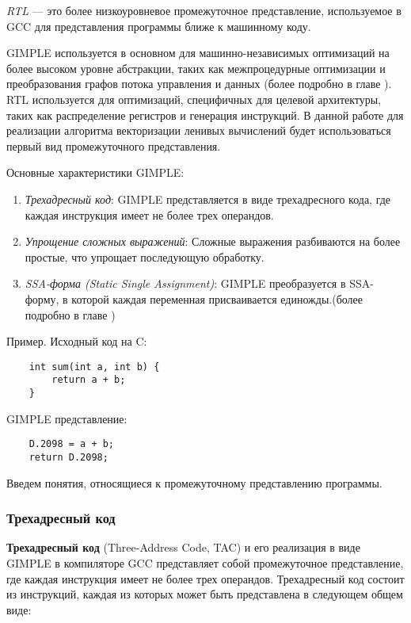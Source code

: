 \textit{RTL} — это более низкоуровневое промежуточное представление, используемое в GCC для представления программы ближе к машинному коду.

GIMPLE используется в основном для машинно-независимых оптимизаций на более высоком уровне абстракции, таких как межпроцедурные оптимизации и преобразования графов потока управления и данных (более подробно в главе \todo[номер]). RTL используется для оптимизаций, специфичных для целевой архитектуры, таких как распределение регистров и генерация инструкций. В данной работе для реализации алгоритма векторизации ленивых вычислений будет использоваться первый вид промежуточного представления.

Основные характеристики GIMPLE:
\begin{enumerate}
    \item \textit{Трехадресный код}: GIMPLE представляется в виде трехадресного кода, где каждая инструкция имеет не более трех операндов.
    \item \textit{Упрощение сложных выражений}: Сложные выражения разбиваются на более простые, что упрощает последующую обработку.
    \item \textit{SSA-форма (Static Single Assignment)}: GIMPLE преобразуется в SSA-форму, в которой каждая переменная присваивается единожды.(более подробно в главе \todo[номер])
\end{enumerate}


Пример. Исходный код на C:
\begin{lstlisting}
    int sum(int a, int b) {
        return a + b;
    }
\end{lstlisting}

GIMPLE представление:
\begin{lstlisting}
    D.2098 = a + b;
    return D.2098;
\end{lstlisting}

Введем понятия, относящиеся к промежуточному представлению программы. 

\subsubsection{Трехадресный код}
\textbf{Трехадресный код} (Three-Address Code, TAC) и его реализация в виде GIMPLE в компиляторе GCC представляет собой промежуточное представление, где каждая инструкция имеет не более трех операндов. Трехадресный код состоит из инструкций, каждая из которых может быть представлена в следующем общем виде:

